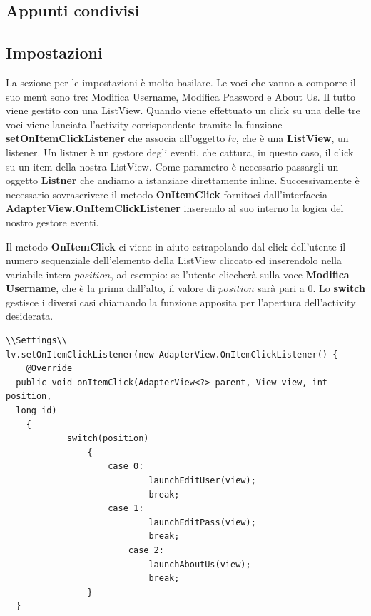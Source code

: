 \documentclass[a4paper, 50pt, twoside]{article}
\begin{document}
\subsection{Appunti condivisi}
\subsection{Impostazioni}
La sezione per le impostazioni è molto basilare. Le voci che vanno a comporre il suo menù sono tre: Modifica Username, Modifica Password e About Us. Il tutto viene gestito con una ListView. Quando viene effettuato un click su una delle tre voci viene lanciata l’activity corrispondente tramite la funzione \textbf{setOnItemClickListener} che associa all'oggetto $lv$, che è una \textbf{ListView}, un listener. Un listner è un gestore degli eventi, che cattura, in questo caso, il click su un item della nostra ListView. Come parametro è necessario passargli un oggetto \textbf{Listner} che andiamo a istanziare direttamente inline. Successivamente è necessario sovrascrivere il metodo \textbf{OnItemClick} fornitoci dall'interfaccia \textbf{AdapterView.OnItemClickListener} inserendo al suo interno la logica del nostro gestore eventi.

Il metodo \textbf{OnItemClick} ci viene in aiuto estrapolando dal click dell'utente il numero sequenziale dell'elemento della ListView cliccato ed inserendolo nella variabile intera $position$, ad esempio: se l'utente cliccherà sulla voce \textbf{Modifica Username}, che è la prima dall'alto, il valore di $position$ sarà pari a $0$. Lo \textbf{switch} gestisce i diversi casi chiamando la funzione apposita per l'apertura dell'activity desiderata.
\begin{lstlisting}
\\Settings\\
lv.setOnItemClickListener(new AdapterView.OnItemClickListener() {
	@Override
  public void onItemClick(AdapterView<?> parent, View view, int position,
  long id)
	{
        	switch(position)
                {
                	case 0:
                        	launchEditUser(view);
                       		break;
                	case 1:
                        	launchEditPass(view);
                        	break;
                        case 2:
                        	launchAboutUs(view);
                        	break;
                }
  }
\end{lstlisting}
\end{document}
